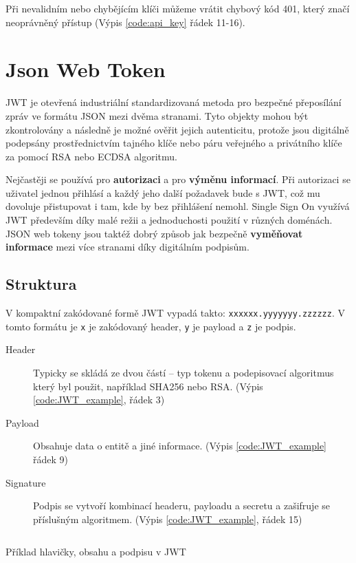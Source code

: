 Při nevalidním nebo chybějícím klíči můžeme vrátit chybový kód 401, který značí neoprávněný přístup (Výpis \ref{code:api_key} řádek 11-16).


\section{Json Web Token} %
\label{sec:jwt}
JWT je otevřená industriální standardizovaná %
metoda pro bezpečné přeposílání zpráv ve formátu JSON mezi dvěma stranami. Tyto objekty mohou být zkontrolovány a následně je možné ověřit jejich autenticitu, protože jsou digitálně podepsány prostřednictvím tajného klíče nebo páru veřejného a privátního klíče za pomocí RSA nebo ECDSA algoritmu.

Nejčastěji se používá pro \textbf{autorizaci} a pro \textbf{výměnu informací}. Při autorizaci se uživatel jednou přihlásí a každý jeho další požadavek bude s JWT, což mu dovoluje přistupovat i tam, kde by bez přihlášení nemohl. Single Sign On %
využívá JWT především díky malé režii a jednoduchosti použití v různých doménách. JSON web tokeny jsou taktéž dobrý způsob jak bezpečně \textbf{vyměňovat informace} mezi více stranami díky digitálním podpisům.

\subsection{Struktura}
V kompaktní zakódované formě JWT vypadá takto: \texttt{xxxxxx.yyyyyyy.zzzzzz}. V tomto formátu je \texttt{x} je zakódovaný header, \texttt{y} je payload a \texttt{z} je podpis.

\begin{description}
    \item[Header] Typicky se skládá ze dvou částí -- typ tokenu a podepisovací algoritmus který byl použit, například SHA256 nebo RSA. (Výpis \ref{code:JWT_example}, řádek 3)
    \item[Payload] Obsahuje data o entitě a jiné informace. (Výpis \ref{code:JWT_example} řádek 9)
    \item[Signature] Podpis se vytvoří kombinací headeru, payloadu a secretu a zašifruje se příslušným algoritmem. (Výpis \ref{code:JWT_example}, řádek 15)
\end{description}

\begin{listing}[ht]
    \inputminted[]{json}{resources/code/security/JWT.jsonc}
    \caption{Příklad hlavičky, obsahu a podpisu v JWT} %
    \label{code:JWT_example}
\end{listing}


